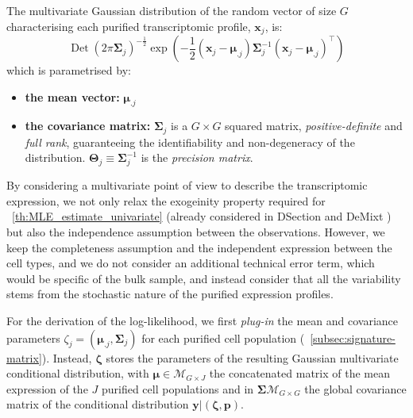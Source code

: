 \documentclass[long, final]{jobim}
\DeclareMathOperator*{\DET}{Det}
\begin{document}
\begin{definition}
\label{def:multivariate-gaussian-distribution}
The multivariate Gaussian distribution of the random vector of size $G$ characterising each purified transcriptomic profile, $\boldsymbol{x}_j$, is:
\begin{equation*}
    \DET(2\pi\boldsymbol{\Sigma}_j)^{-\frac{1}{2}} \exp\left( -\frac{1}{2} (\boldsymbol{x}_j - \boldsymbol{\mu}_{.j}) \boldsymbol{\Sigma}_j^{-1} (\boldsymbol{x}_j - \boldsymbol{\mu}_{.j})^\top\right)
\end{equation*}
which is parametrised by:
\begin{itemize}
    \item \textbf{the mean vector:} $\boldsymbol{\mu}_{.j}$
    \item \textbf{the covariance matrix:} $\boldsymbol{\Sigma}_j$ is a $G\times G$ squared matrix, \textit{positive-definite} and \textit{full rank}, guaranteeing the identifiability and non-degeneracy of the distribution. $\boldsymbol{\Theta}_j \equiv \boldsymbol{\Sigma}_j^{-1}$ is the \textit{precision matrix}.
\end{itemize}
\end{definition}

By considering a multivariate point of view to describe the transcriptomic expression, we not only relax the exogeinity property required for \theoremname~\ref{th:MLE_estimate_univariate} (already considered in  DSection \cite{erkkila_etal10} and DeMixt \cite{wang_etal18}) but also the independence assumption between the observations. However, we keep the completeness assumption and the independent expression between the cell types, and we do not consider an additional technical error term, which would be specific of the bulk sample, and instead consider that all the variability stems from the stochastic nature of the purified expression profiles.




For the derivation of the log-likelihood, we first \textit{plug-in} the mean and covariance parameters $\zeta_j=\left(\boldsymbol{\mu}_{.j}, \boldsymbol{\Sigma}_j\right)$ for each purified cell population (\sectionname~\ref{subsec:signature-matrix}). Instead, $\boldsymbol{\zeta}$ stores the parameters of the resulting Gaussian multivariate conditional distribution, with $\boldsymbol{\mu} \in \mathcal{M}_{G \times J}$ the concatenated matrix of the mean expression of the $J$ purified cell populations and in $\boldsymbol{\Sigma} \mathcal{M}_{G \times G}$ the global covariance matrix of the conditional distribution $\boldsymbol{y}|(\boldsymbol{\zeta}, \boldsymbol{p})$.
\end{document}
